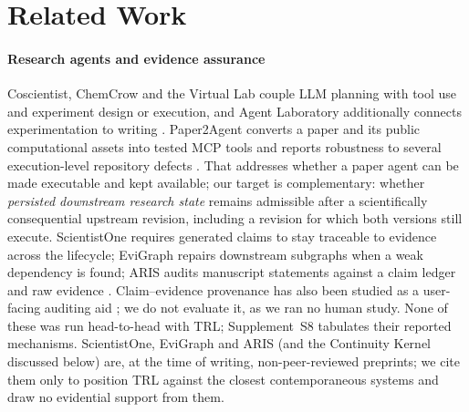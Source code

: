 \documentclass[journal]{IEEEtran}
\newcommand{\suppl}[1]{Supplement~#1}
\begin{document}
\section{Related Work}
\label{sec:related}
\paragraph{Research agents and evidence assurance}
Coscientist, ChemCrow and the Virtual Lab couple LLM planning with tool use and experiment design or execution, and Agent Laboratory additionally connects experimentation to writing \cite{boiko2023coscientist,bran2024chemcrow,swanson2025virtuallab,schmidgall2025agentlab}. Paper2Agent converts a paper and its public computational assets into tested MCP tools and reports robustness to several execution-level repository defects \cite{miao2026paper2agent}. That addresses whether a paper agent can be made executable and kept available; our target is complementary: whether \emph{persisted downstream research state} remains admissible after a scientifically consequential upstream revision, including a revision for which both versions still execute. ScientistOne requires generated claims to stay traceable to evidence across the lifecycle; EviGraph repairs downstream subgraphs when a weak dependency is found; ARIS audits manuscript statements against a claim ledger and raw evidence \cite{meng2026scientistone,ren2026evigraph,yang2026aris}. Claim--evidence provenance has also been studied as a user-facing auditing aid \cite{martinboyle2026papertrail}; we do not evaluate it, as we ran no human study. None of these was run head-to-head with TRL; \suppl{S8} tabulates their reported mechanisms. ScientistOne, EviGraph and ARIS (and the Continuity Kernel discussed below) are, at the time of writing, non-peer-reviewed preprints; we cite them only to position TRL against the closest contemporaneous systems and draw no evidential support from them.
\end{document}
